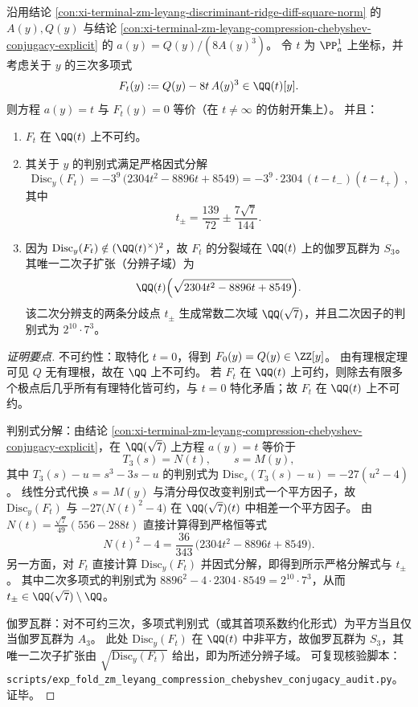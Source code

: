 \begin{conclusion}\label{con:xi-terminal-zm-leyang-compression-cubic-preimage-discriminant-s3}
沿用结论 \ref{con:xi-terminal-zm-leyang-discriminant-ridge-diff-square-norm} 的 \(A(y),Q(y)\) 与结论 \ref{con:xi-terminal-zm-leyang-compression-chebyshev-conjugacy-explicit} 的 \(a(y)=Q(y)/(8A(y)^3)\)。
令 \(t\) 为 \(\PP^1_{a}\) 上坐标，并考虑关于 \(y\) 的三次多项式
\[
F_{t}(y):=Q(y)-8t\,A(y)^{3}\in\QQ(t)[y].
\]
则方程 \(a(y)=t\) 与 \(F_t(y)=0\) 等价（在 \(t\neq\infty\) 的仿射开集上）。
并且：
\begin{enumerate}
  \item \(F_t\) 在 \(\QQ(t)\) 上不可约。

  \item 其关于 \(y\) 的判别式满足严格因式分解
  \[
  \boxed{\;
  \mathrm{Disc}_{y}(F_t)=-3^{9}\,\bigl(2304t^{2}-8896t+8549\bigr)
  =-3^{9}\cdot 2304\,(t-t_{-})(t-t_{+})\; },
  \]
  其中
  \[
  t_{\pm}=\frac{139}{72}\pm\frac{7\sqrt7}{144}.
  \]

  \item 因为 \(\mathrm{Disc}_{y}(F_t)\notin(\QQ(t)^{\times})^{2}\)，故 \(F_t\) 的分裂域在 \(\QQ(t)\) 上的伽罗瓦群为 \(S_{3}\)。
  其唯一二次子扩张（分辨子域）为
  \[
  \QQ(t)\Bigl(\sqrt{2304t^{2}-8896t+8549}\Bigr).
  \]
  该二次分辨支的两条分歧点 \(t_{\pm}\) 生成常数二次域 \(\QQ(\sqrt7)\)，并且二次因子的判别式为 \(2^{10}\cdot 7^{3}\)。
\end{enumerate}
\end{conclusion}
\begin{proof}[证明要点]
不可约性：取特化 \(t=0\)，得到 \(F_{0}(y)=Q(y)\in\ZZ[y]\)。
由有理根定理可见 \(Q\) 无有理根，故在 \(\QQ\) 上不可约。
若 \(F_t\) 在 \(\QQ(t)\) 上可约，则除去有限多个极点后几乎所有有理特化皆可约，与 \(t=0\) 特化矛盾；故 \(F_t\) 在 \(\QQ(t)\) 上不可约。
\par
判别式分解：由结论 \ref{con:xi-terminal-zm-leyang-compression-chebyshev-conjugacy-explicit}，在 \(\QQ(\sqrt7)\) 上方程 \(a(y)=t\) 等价于
\[
T_{3}(s)=N(t),\qquad s=M(y),
\]
其中 \(T_{3}(s)-u=s^{3}-3s-u\) 的判别式为 \(\mathrm{Disc}_{s}(T_{3}(s)-u)=-27(u^{2}-4)\)。
线性分式代换 \(s=M(y)\) 与清分母仅改变判别式一个平方因子，故 \(\mathrm{Disc}_{y}(F_t)\) 与 \(-27\bigl(N(t)^{2}-4\bigr)\) 在 \(\QQ(\sqrt7)(t)\) 中相差一个平方因子。
由 \(N(t)=\frac{\sqrt7}{49}(556-288t)\) 直接计算得到严格恒等式
\[
N(t)^{2}-4=\frac{36}{343}\,\bigl(2304t^{2}-8896t+8549\bigr).
\]
另一方面，对 \(F_t\) 直接计算 \(\mathrm{Disc}_{y}(F_t)\) 并因式分解，即得到所示严格分解式与 \(t_{\pm}\)。
其中二次多项式的判别式为
\(
8896^{2}-4\cdot 2304\cdot 8549=2^{10}\cdot 7^{3}
\)，从而 \(t_{\pm}\in\QQ(\sqrt7)\setminus\QQ\)。
\par
伽罗瓦群：对不可约三次，多项式判别式（或其首项系数约化形式）为平方当且仅当伽罗瓦群为 \(A_{3}\)。
此处 \(\mathrm{Disc}_{y}(F_t)\) 在 \(\QQ(t)\) 中非平方，故伽罗瓦群为 \(S_{3}\)，其唯一二次子扩张由 \(\sqrt{\mathrm{Disc}_{y}(F_t)}\) 给出，即为所述分辨子域。
可复现核验脚本：\texttt{scripts/exp\_fold\_zm\_leyang\_compression\_chebyshev\_conjugacy\_audit.py}。证毕。
\end{proof}

